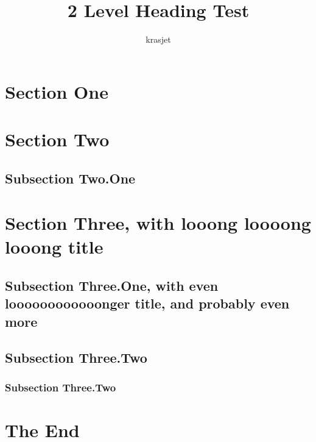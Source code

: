 \documentclass{article}
\title{2 Level Heading Test}
\author{krasjet}
\date{}
\begin{document}
\maketitle

\section{Section One}

\lipsum[2-4]

\section{Section Two}

\lipsum[2-5]

\subsection{Subsection Two.One}
\lipsum[2-5]

\section{Section Three, with looong loooong looong title}

\lipsum[1-2]

\subsection{Subsection Three.One, with even loooooooooooonger title, and
probably even more}
\lipsum[2-5]

\subsection{Subsection Three.Two}
\lipsum[1-1]

\subsubsection{Subsection Three.Two}
\lipsum[2-3]

\section{The End}

\lipsum[2-5]
\end{document}
